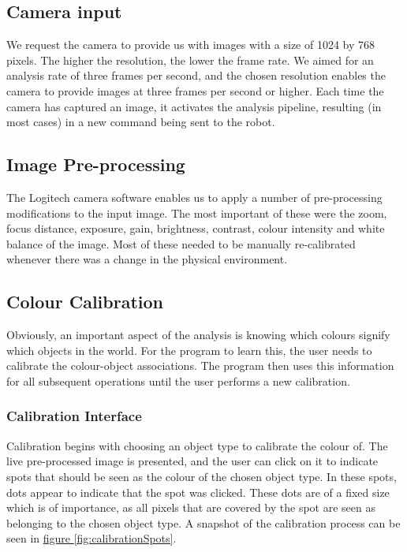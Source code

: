 \documentclass[10pt, abstracton, twocolumn]{scrartcl}
\newcommand{\fref}[1]{\hyperref[#1]{figure \vref{#1}}}
\begin{document}
\subsection{Camera input}
We request the camera to provide us with images with a size of 1024 by 768 pixels. The higher the resolution, the lower the frame rate. We aimed for an analysis rate of three frames per second, and the chosen resolution enables the camera to provide images at three frames per second or higher. Each time the camera has captured an image, it activates the analysis pipeline, resulting (in most cases) in a new command being sent to the robot.

\subsection{Image Pre-processing}
The Logitech camera software enables us to apply a number of pre-processing modifications to the input image. The most important of these were the zoom, focus distance, exposure, gain, brightness, contrast, colour intensity and white balance of the image. Most of these needed to be manually re-calibrated whenever there was a change in the physical environment.


\subsection{Colour Calibration}
Obviously, an important aspect of the analysis is knowing which colours signify which objects in the world. For the program to learn this, the user needs to calibrate the colour-object associations. The program then uses this information for all subsequent operations until the user performs a new calibration.

\subsubsection{Calibration Interface}
Calibration begins with choosing an object type to calibrate the colour of. The live pre-processed image is presented, and the user can click on it to indicate spots that should be seen as the colour of the chosen object type. In these spots, dots appear to indicate that the spot was clicked. These dots are of a fixed size which is of importance, as all pixels that are covered by the spot are seen as belonging to the chosen object type. A snapshot of the calibration process can be seen in \fref{fig:calibrationSpots}.
\end{document}
